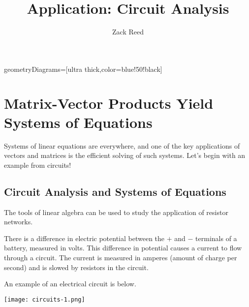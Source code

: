 \documentclass{ximera}
\author{Zack Reed} %
\title{Application: Circuit Analysis}
\begin{document}
\begin{abstract}

\end{abstract}
\maketitle



\tikzstyle geometryDiagrams=[ultra thick,color=blue!50!black]

\section{Matrix-Vector Products Yield Systems of Equations}

Systems of linear equations are everywhere, and one of the key applications of vectors and matrices is the efficient solving of such systems. Let's begin with an example from circuits!

\subsection*{Circuit Analysis and Systems of Equations}

  The tools of linear algebra can be used to study the application of resistor networks. 

There is a difference in electric potential between the $+$ and $-$ terminals of a battery, measured in volts. This difference in potential causes a current to flow through a circuit. The current is measured in amperes (amount of charge per second) and is slowed by resistors in the circuit. 

An example of an electrical circuit is below.

\begin{center}
  \texttt{[image: circuits-1.png]}
\end{center}
\end{document}
